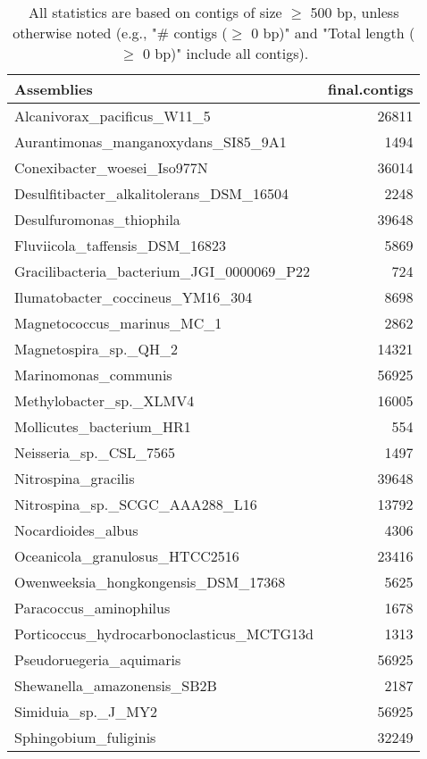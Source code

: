 \documentclass[12pt,a4paper]{article}
\begin{document}
\begin{table}[ht]
\begin{center}
\caption{All statistics are based on contigs of size $\geq$ 500 bp, unless otherwise noted (e.g., "\# contigs ($\geq$ 0 bp)" and "Total length ($\geq$ 0 bp)" include all contigs).}
\begin{tabular}{|l*{1}{|r}|}
\hline
Assemblies & final.contigs \\ \hline
Alcanivorax\_pacificus\_W11\_5 & 26811 \\ \hline
Aurantimonas\_manganoxydans\_SI85\_9A1 & 1494 \\ \hline
Conexibacter\_woesei\_Iso977N & 36014 \\ \hline
Desulfitibacter\_alkalitolerans\_DSM\_16504 & 2248 \\ \hline
Desulfuromonas\_thiophila & 39648 \\ \hline
Fluviicola\_taffensis\_DSM\_16823 & 5869 \\ \hline
Gracilibacteria\_bacterium\_JGI\_0000069\_P22 & 724 \\ \hline
Ilumatobacter\_coccineus\_YM16\_304 & 8698 \\ \hline
Magnetococcus\_marinus\_MC\_1 & 2862 \\ \hline
Magnetospira\_sp.\_QH\_2 & 14321 \\ \hline
Marinomonas\_communis & 56925 \\ \hline
Methylobacter\_sp.\_XLMV4 & 16005 \\ \hline
Mollicutes\_bacterium\_HR1 & 554 \\ \hline
Neisseria\_sp.\_CSL\_7565 & 1497 \\ \hline
Nitrospina\_gracilis & 39648 \\ \hline
Nitrospina\_sp.\_SCGC\_AAA288\_L16 & 13792 \\ \hline
Nocardioides\_albus & 4306 \\ \hline
Oceanicola\_granulosus\_HTCC2516 & 23416 \\ \hline
Owenweeksia\_hongkongensis\_DSM\_17368 & 5625 \\ \hline
Paracoccus\_aminophilus & 1678 \\ \hline
Porticoccus\_hydrocarbonoclasticus\_MCTG13d & 1313 \\ \hline
Pseudoruegeria\_aquimaris & 56925 \\ \hline
Shewanella\_amazonensis\_SB2B & 2187 \\ \hline
Simiduia\_sp.\_J\_MY2 & 56925 \\ \hline
Sphingobium\_fuliginis & 32249 \\ \hline

\end{tabular}
\end{center}
\end{table}
\end{document}
